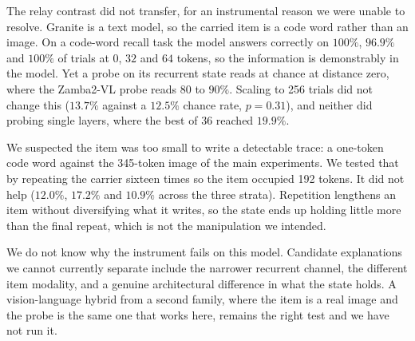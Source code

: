 \documentclass{article}
\begin{document}
The relay contrast did not transfer, for an instrumental reason we were unable
to resolve. Granite is a text model, so the carried item is a code word rather
than an image. On a code-word recall task the model answers correctly on
$100\%$, $96.9\%$ and $100\%$ of trials at $0$, $32$ and $64$ tokens, so the
information is demonstrably in the model. Yet a probe on its recurrent state
reads at chance at distance zero, where the Zamba2-VL probe reads $80$ to
$90\%$. Scaling to 256 trials did not change this ($13.7\%$ against a $12.5\%$
chance rate, $p = 0.31$), and neither did probing single layers, where the best
of 36 reached $19.9\%$.

We suspected the item was too small to write a detectable trace: a one-token
code word against the 345-token image of the main experiments. We tested that by
repeating the carrier sixteen times so the item occupied 192 tokens. It did not
help ($12.0\%$, $17.2\%$ and $10.9\%$ across the three strata). Repetition
lengthens an item without diversifying what it writes, so the state ends up
holding little more than the final repeat, which is not the manipulation we
intended.

We do not know why the instrument fails on this model. Candidate explanations
we cannot currently separate include the narrower recurrent channel, the
different item modality, and a genuine architectural difference in what the
state holds. A vision-language hybrid from a second family, where the item is
a real image and the probe is the same one that works here, remains the right
test and we have not run it.
\end{document}

